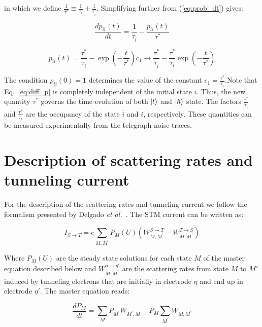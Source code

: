 \documentclass[reprint,amsmath,amssymb,aps,nofootinbib,onecolumn]{revtex4-2}
\begin{document}
in which we define $\frac{1}{\tau^*}\equiv\frac{1}{\tau_i}+\frac{1}{\tau_{\overline{i}}}$. Simplifying further from  (\ref{eq:prob_dt}) gives:

\begin{equation}
\frac{dp_{ii}(t)}{dt}=\frac{1}{\tau_{\overline{i}}}-\frac{p_{ii}(t)}{\tau^*}  
\label{eq:diff_p}
\end{equation}

\begin{equation}
p_{ii}(t)=\frac{\tau^*}{\tau_{\overline{i}}}-\exp(-\frac{t}{\tau^{*}})c_1\rightarrow\frac{\tau^{*}}{\tau_{\overline{i}}}-\frac{\tau^{*}}{\tau_i}\exp(-\frac{t}{\tau^*})
\label{eq:sol_diff}
\end{equation}

The condition $p_{ii}(0)=1$ determines the value of the constant $c_1=\frac{\tau^{*}}{\tau_i}$.Note that Eq.~\ref{eq:diff_p} is completely independent of the initial state $i$. Thus, the new quantity $\tau^{*}$ governs the time evolution of both $\ket{l}$ and $\ket{h}$ state. The factors $\frac{\tau^{*}}{\tau_{\overline{i}}} $ and $ \frac{\tau^{*}}{\tau_{i}} $ are the occupancy of the state $\overline{i}$ and $i$, respectively. These quantities can be measured experimentally from the telegraph-noise traces.  


\section{Description of scattering rates and tunneling current}

For the description of the scattering rates and tunneling current we follow the formalism presented by Delgado \textit{et al.}~\cite{delgado2010}. The STM current can be written as:

\begin{equation}
I_{S\rightarrow T} = e \sum_{M,M^{\prime}}P_M(U)\left(W_{M,M^{\prime}}^{S\rightarrow T}-W_{M,M^{\prime}}^{T\rightarrow S}\right)
\label{eq:stm_curr}
\end{equation}

Where $P_M(U)$ are the steady state solutions for each state $M$ of the master equation described below and $W_{M,M^{\prime}}^{\eta \rightarrow \eta'}$ are the scattering rates from state $M$ to $M'$ induced by tunneling electrons that are initially in electrode $\eta$ and end up in electrode $\eta'$. The master equation reads:

\begin{equation}
\dfrac{dP_M}{dt}=\sum_M P_{M^{\prime}}W_{M^{\prime},M} - P_M\sum_{M^{\prime}}W_{M,M^{\prime}}
\end{equation}
\end{document}
